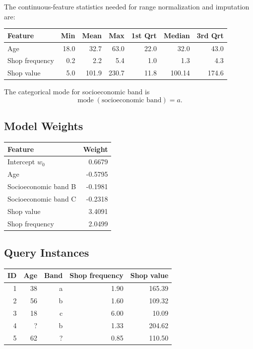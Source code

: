 \documentclass[11pt]{article}
\begin{document}
The continuous-feature statistics needed for range normalization and imputation
are:

\begin{center}
\begin{tabular}{lrrrrrr}
\toprule
Feature & Min & Mean & Max & 1st Qrt & Median & 3rd Qrt \\
\midrule
Age & 18.0 & 32.7 & 63.0 & 22.0 & 32.0 & 43.0 \\
Shop frequency & 0.2 & 2.2 & 5.4 & 1.0 & 1.3 & 4.3 \\
Shop value & 5.0 & 101.9 & 230.7 & 11.8 & 100.14 & 174.6 \\
\bottomrule
\end{tabular}
\end{center}

The categorical mode for socioeconomic band is
\[
    \operatorname{mode}(\text{socioeconomic band}) = a.
\]

\subsection*{Model Weights}

\begin{center}
\begin{tabular}{lr}
\toprule
Feature & Weight \\
\midrule
Intercept \(w_0\) & 0.6679 \\
Age & -0.5795 \\
Socioeconomic band B & -0.1981 \\
Socioeconomic band C & -0.2318 \\
Shop value & 3.4091 \\
Shop frequency & 2.0499 \\
\bottomrule
\end{tabular}
\end{center}

\subsection*{Query Instances}

\begin{center}
\begin{tabular}{rrrrr}
\toprule
ID & Age & Band & Shop frequency & Shop value \\
\midrule
1 & 38 & a & 1.90 & 165.39 \\
2 & 56 & b & 1.60 & 109.32 \\
3 & 18 & c & 6.00 & 10.09 \\
4 & ? & b & 1.33 & 204.62 \\
5 & 62 & ? & 0.85 & 110.50 \\
\bottomrule
\end{tabular}
\end{center}
\end{document}
